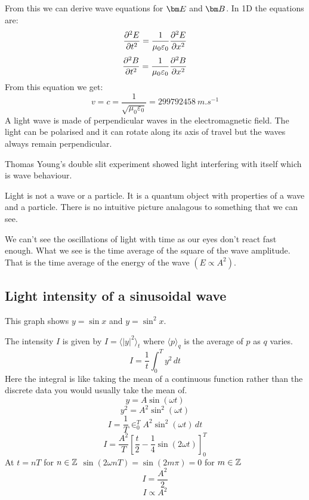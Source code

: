 From this we can derive wave equations for \(\vv E\) and \(\vv B\). In 1D the equations are:
\[\pd[2]{E}{t}=\frac{1}{\mu_0\varepsilon_0}\pd[2]{E}{x}\]
\[\pd[2]{B}{t}=\frac{1}{\mu_0\varepsilon_0}\pd[2]{B}{x}\]
From this equation we get:
\[v=c=\frac{1}{\sqrt{\mu_0\varepsilon_0}}=\SI{299792458}{m.s^{-1}}\]
A light wave is made of perpendicular waves in the electromagnetic field. The light can be polarised and it can rotate along its axis of travel but the waves always remain perpendicular.

Thomas Young's double slit experiment showed light interfering with itself which is wave behaviour.

Light is not a wave or a particle. It is a quantum object with properties of a wave and a particle. There is no intuitive picture analagous to something that we can see.

We can't see the oscillations of light with time as our eyes don't react fast enough. What we see is the time average of the square of the wave amplitude. That is the time average of the energy of the wave \((E\propto A^2)\).

\subsection*{Light intensity of a sinusoidal wave}


This graph shows \(y=\sin x\) and \(y=\sin^2x\).

The intensity \(I\) is given by \(I=\langle|y|^2\rangle_t\) where \(\langle p\rangle_q\) is the average of \(p\) as \(q\) varies.
\[I=\frac 1t\int_0^Ty^2\,dt\]
Here the integral is like taking the mean of a continuous function rather than the discrete data you would usually take the mean of.
\[y=A\sin(\omega t)\]
\[y^2=A^2\sin^2(\omega t)\]
\[I=\frac 1T\in_0^TA^2\sin^2(\omega t)\,dt\]
\[I=\frac{A^2}{T}\left[\frac t2-\frac 14\sin(2\omega t)\right]_0^T\]
At \(t=nT\) for \(n\in\bb Z\) \(\sin(2\omega nT)=\sin(2m\pi)=0\) for \(m\in\bb Z\)
\[I=\frac{A^2}{2}\]
\[I\propto A^2\]

